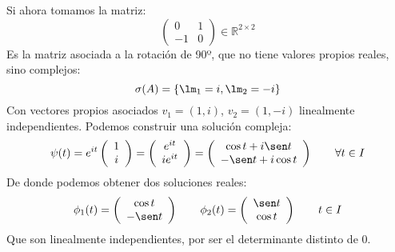 \begin{ejemplo}
    Si ahora tomamos la matriz:
    \begin{equation*}
        \left(\begin{array}{cc}
                0 & 1 \\
                -1 & 0
        \end{array}\right) \in \mathbb{R}^{2\times 2}
    \end{equation*}
    Es la matriz asociada a la rotación de 90º, que no tiene valores propios reales, sino complejos:
    \begin{equation*}
        \sigma(A) = \{\lm_1 = i, \lm_2 = -i\}
    \end{equation*}
    Con vectores propios asociados $v_1=(1,i)$, $v_2=(1,-i)$ linealmente independientes. Podemos construir una solución compleja:
    \begin{equation*}
        \psi(t) = e^{it} 
        \left(\begin{array}{c}
                1\\
                i
        \end{array}\right) = 
        \left(\begin{array}{c}
                e^{it} \\
                ie^{it}
        \end{array}\right) = 
        \left(\begin{array}{c}
                \cos t + i\sen t \\
                -\sen t + i\cos t
        \end{array}\right) \qquad \forall t\in I
    \end{equation*}
    De donde podemos obtener dos soluciones reales:
    \begin{equation*}
        \phi_1(t) = \left(\begin{array}{c}
            \cos t\\
            -\sen t
        \end{array}\right) \qquad 
        \phi_2(t) = \left(\begin{array}{c}
            \sen t\\
            \cos t
        \end{array}\right) \qquad t\in I
    \end{equation*}
    Que son linealmente independientes, por ser el determinante distinto de 0.
\end{ejemplo}
